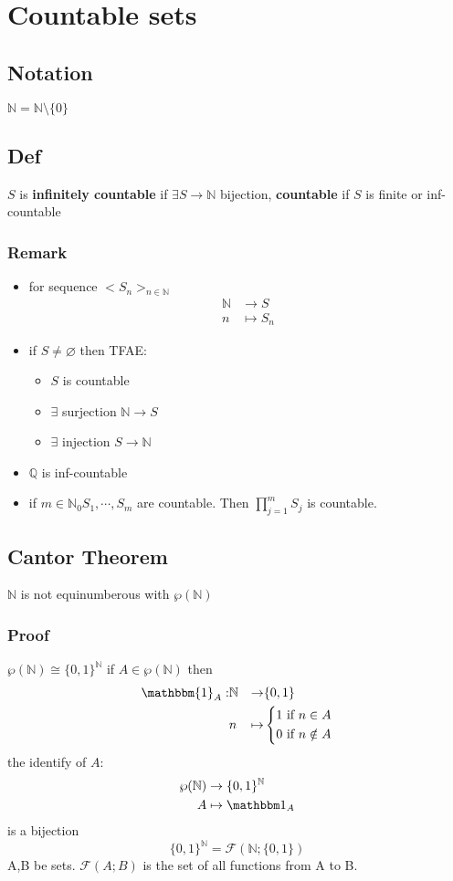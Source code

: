 \documentclass{book}
\begin{document}
\tableofcontents
\chapter{Countable sets}
\section{Notation}
$\mathbb N=\mathbb N\setminus \{0\}$
\section{Def}
$S$ is \textbf{infinitely countable} if $\exists S\rightarrow \mathbb N$ bijection, \textbf{countable} if $S$ is finite or inf-countable
\subsection*{Remark}
\begin{itemize}
    \item for sequence $<S_n>_{n\in \mathbb N}$$$\begin{aligned}
        \mathbb N &\rightarrow S\\ n&\mapsto S_n
    \end{aligned}$$
    \item if $S\neq \varnothing$ then TFAE:
    \begin{itemize}
        \item $S$ is countable
        \item $\exists$ surjection $\mathbb N\rightarrow S$
        \item $\exists$ injection $S\rightarrow \mathbb N$
    \end{itemize}
    \item $\mathbb Q$ is inf-countable
    \item if $m\in \mathbb N_0$$S_1,\cdots,S_m$ are countable. Then $\prod\limits_{j=1}^m S_j$ is countable.
\end{itemize}
\section{Cantor Theorem}$\mathbb N$ is not equinumberous with $\mathbb{\wp(\mathbb N)}$
\subsection*{Proof}
$\wp(\mathbb N)\cong \{0,1\}^{\mathbb N}$ if $A\in \wp(\mathbb N)$ then $$\begin{aligned}
    \mathbbm{1}_A:&\mathbb{N}&\rightarrow&\{0,1\}\\ & n&\mapsto &\left\{\begin{aligned}
        1&\text{ if }n\in A\\ 0&\text{ if }n\notin A
    \end{aligned}\right.
\end{aligned}$$
the identify of $A$:
$$\begin{aligned}
    \wp(\mathbb N) &\rightarrow\{0,1\}^{\mathbb{N}}\\A &\mapsto \mathbbm 1_A
\end{aligned}$$
is a bijection$$\{0,1\}^{\mathbb N}=\mathcal{F}(\mathbb N;\{0,1\})$$
A,B be sets. $\mathcal{F}(A;B)$ is the set of all functions from A to B.
\end{document}
